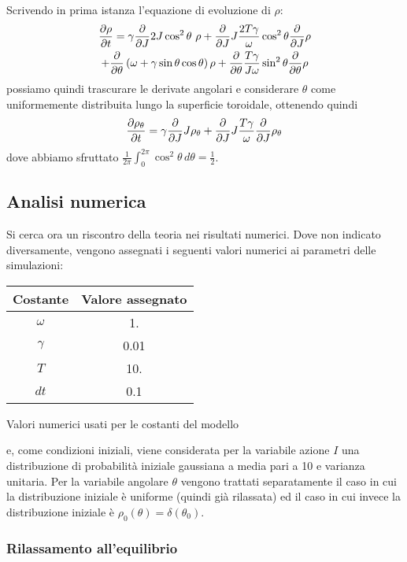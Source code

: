 \documentclass[10pt,a4paper]{article}
\begin{document}
Scrivendo in prima istanza l'equazione di evoluzione di $\rho$:
\begin{multline}
	\pdv{\rho}{t} = \gamma \pdv{}{J} 2J\cos^2\theta\,\,\rho + \pdv{}{J} J\frac{2T\gamma}{\omega}\cos^2\theta \pdv{}{J} \rho \\+ \pdv{}{\theta} \left(\omega + \gamma \sin{\theta}\cos{\theta}\right) \rho + \pdv{}{\theta} \frac{T\gamma}{J\omega}\sin^2\theta \pdv{}{\theta}\rho
\end{multline} 
possiamo quindi trascurare le derivate angolari e considerare $\theta$ come uniformemente distribuita lungo la superficie toroidale, ottenendo quindi
\begin{equation}
	\pdv{\rho_\theta}{t} = \gamma \pdv{}{J} J\rho_\theta + \pdv{}{J} J\frac{T\gamma}{\omega} \pdv{}{J} \rho_\theta
	\label{eq:pendolo_fokker_planck_1}
\end{equation}
dove abbiamo sfruttato \(\frac{1}{2\pi}\int_0^{2\pi}\cos^2\theta\, d\theta = \frac{1}{2}\).\\

\subsection{Analisi numerica}

Si cerca ora un riscontro della teoria nei risultati numerici. Dove non indicato diversamente, vengono assegnati i seguenti valori numerici ai parametri delle simulazioni:
\begin{center}
	\begin{tabular}{cS}
	\toprule
	Costante & {Valore assegnato} \\
	\midrule
	$\omega$	& 1.	\\
	$\gamma$	& 0.01	\\
	$T$			& 10.	\\
	$dt$		& 0.1	\\
	\bottomrule
	\end{tabular}
	\label{tab:valori_1}
	\caption{Valori numerici usati per le costanti del modello}
\end{center}
e, come condizioni iniziali, viene considerata per la variabile azione $I$ una distribuzione di probabilità iniziale gaussiana a media pari a 10 e varianza unitaria. Per la variabile angolare $\theta$ vengono trattati separatamente il caso in cui la distribuzione iniziale è uniforme (quindi già rilassata) ed il caso in cui invece la distribuzione iniziale è $\rho_0(\theta)=\delta(\theta_0)$.

\subsubsection{Rilassamento all'equilibrio}
\end{document}
